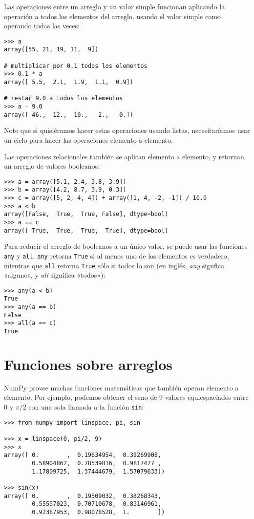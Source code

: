 Las operaciones entre un arreglo y un valor simple funcionan aplicando
la operación a todos los elementos del arreglo, usando el valor simple
como operando todas las veces:

\begin{lstlisting}
>>> a
array([55, 21, 19, 11,  9])

# multiplicar por 0.1 todos los elementos
>>> 0.1 * a
array([ 5.5,  2.1,  1.9,  1.1,  0.9])

# restar 9.0 a todos los elementos
>>> a - 9.0
array([ 46.,  12.,  10.,   2.,   0.])
\end{lstlisting}

Note que si quisiéramos hacer estas operaciones usando listas,
necesitaríamos usar un ciclo para hacer las operaciones elemento a
elemento.

Las operaciones relacionales también se aplican elemento a elemento, y
retornan un arreglo de valores booleanos:

\begin{lstlisting}
>>> a = array([5.1, 2.4, 3.8, 3.9])
>>> b = array([4.2, 8.7, 3.9, 0.3])
>>> c = array([5, 2, 4, 4]) + array([1, 4, -2, -1]) / 10.0
>>> a < b
array([False,  True,  True, False], dtype=bool)
>>> a == c
array([ True,  True,  True,  True], dtype=bool)
\end{lstlisting}

Para reducir el arreglo de booleanos a un único valor, se puede usar las
funciones \lstinline!any! y \lstinline!all!. \lstinline!any! retorna
\lstinline!True! si al menos uno de los elementos es verdadero, mientras
que \lstinline!all! retorna \lstinline!True! sólo si todos lo son (en
inglés, \emph{any} signfica «alguno», y \emph{all} significa «todos»):

\begin{lstlisting}
>>> any(a < b)
True
>>> any(a == b)
False
>>> all(a == c)
True
\end{lstlisting}

\section{Funciones sobre arreglos}

NumPy provee muchas funciones matemáticas que también operan elemento a
elemento. Por ejemplo, podemos obtener el seno de 9 valores
equiespaciados entre \(0\) y \(\pi/2\) con una sola llamada a la función
\lstinline!sin!:

\begin{lstlisting}
>>> from numpy import linspace, pi, sin

>>> x = linspace(0, pi/2, 9)
>>> x
array([ 0.        ,  0.19634954,  0.39269908,
        0.58904862,  0.78539816,  0.9817477 ,
        1.17809725,  1.37444679,  1.57079633])

>>> sin(x)
array([ 0.        ,  0.19509032,  0.38268343,
        0.55557023,  0.70710678,  0.83146961,
        0.92387953,  0.98078528,  1.        ])
\end{lstlisting}

